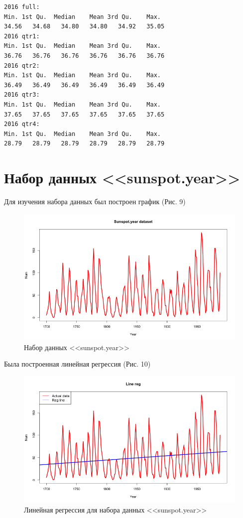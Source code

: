 \documentclass[]{article}
\numberwithin{equation}{section}
\begin{document}
    \begin{lstlisting}[style = TEXTstyle, caption = Прогноз на 2016 год]
2016 full:
Min. 1st Qu.  Median    Mean 3rd Qu.    Max.
34.56   34.68   34.80   34.80   34.92   35.05
2016 qtr1:
Min. 1st Qu.  Median    Mean 3rd Qu.    Max.
36.76   36.76   36.76   36.76   36.76   36.76
2016 qtr2:
Min. 1st Qu.  Median    Mean 3rd Qu.    Max.
36.49   36.49   36.49   36.49   36.49   36.49
2016 qtr3:
Min. 1st Qu.  Median    Mean 3rd Qu.    Max.
37.65   37.65   37.65   37.65   37.65   37.65
2016 qtr4:
Min. 1st Qu.  Median    Mean 3rd Qu.    Max.
28.79   28.79   28.79   28.79   28.79   28.79
    \end{lstlisting}

    \section{Набор данных <<sunspot.year>>}
    Для изучения набора данных был построен график (Рис. 9)

    \begin{figure}[H]
        \centering
        \includegraphics[width = 0.9\linewidth]{data/sunspotyear_data.png}
        \caption{Набор данных <<sunspot.year>>}
    \end{figure}

    Была построенная линейная регрессия (Рис. 10)

    \begin{figure}[H]
        \centering
        \includegraphics[width = 0.9\linewidth]{data/sunspotyear_reg.png}
        \caption{Линейная регрессия для набора данных <<sunspot.year>>}
    \end{figure}
\end{document}
